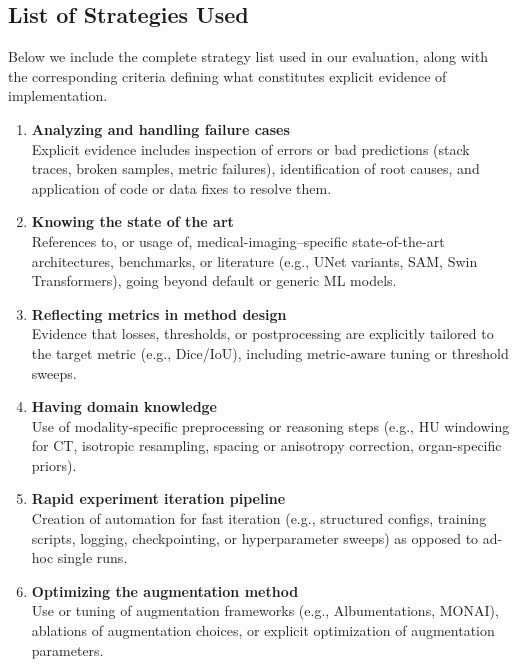 \subsection{List of Strategies Used}
Below we include the complete strategy list used in our evaluation, along with the
corresponding criteria defining what constitutes explicit evidence of implementation.

\begin{enumerate}
    \item \textbf{Analyzing and handling failure cases} \\
    Explicit evidence includes inspection of errors or bad predictions (stack traces,
    broken samples, metric failures), identification of root causes, and application
    of code or data fixes to resolve them.

    \item \textbf{Knowing the state of the art} \\
    References to, or usage of, medical-imaging–specific state-of-the-art architectures,
    benchmarks, or literature (e.g., UNet variants, SAM, Swin Transformers), going
    beyond default or generic ML models.

    \item \textbf{Reflecting metrics in method design} \\
    Evidence that losses, thresholds, or postprocessing are explicitly tailored to the
    target metric (e.g., Dice/IoU), including metric-aware tuning or threshold sweeps.

    \item \textbf{Having domain knowledge} \\
    Use of modality-specific preprocessing or reasoning steps (e.g., HU windowing for CT,
    isotropic resampling, spacing or anisotropy correction, organ-specific priors).

    \item \textbf{Rapid experiment iteration pipeline} \\
    Creation of automation for fast iteration (e.g., structured configs, training scripts,
    logging, checkpointing, or hyperparameter sweeps) as opposed to ad-hoc single runs.

    \item \textbf{Optimizing the augmentation method} \\
    Use or tuning of augmentation frameworks (e.g., Albumentations, MONAI), ablations
    of augmentation choices, or explicit optimization of augmentation parameters.


\end{enumerate}

